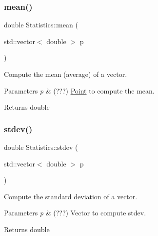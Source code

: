 \subsubsection{\texorpdfstring{mean()}{mean()}}
{\footnotesize\ttfamily double Statistics\+::mean (\begin{DoxyParamCaption}\item[{std\+::vector$<$ double $>$}]{p }\end{DoxyParamCaption})\hspace{0.3cm}{\ttfamily [static]}}



Compute the mean (average) of a vector. 


\begin{DoxyParams}{Parameters}
{\em p} & (???) \hyperlink{class_point}{Point} to compute the mean. \\
\hline
\end{DoxyParams}
\begin{DoxyReturn}{Returns}
double 
\end{DoxyReturn}
\mbox{\label{class_statistics_a75435245095cd0fd54b2d57a6ae592da}} 
\subsubsection{\texorpdfstring{stdev()}{stdev()}}
{\footnotesize\ttfamily double Statistics\+::stdev (\begin{DoxyParamCaption}\item[{std\+::vector$<$ double $>$}]{p }\end{DoxyParamCaption})\hspace{0.3cm}{\ttfamily [static]}}



Compute the standard deviation of a vector. 


\begin{DoxyParams}{Parameters}
{\em p} & (???) Vector to compute stdev. \\
\hline
\end{DoxyParams}
\begin{DoxyReturn}{Returns}
double 
\end{DoxyReturn}
\mbox{\label{class_statistics_af3a74e0ab944341356b8afeb9fc0ecbd}} 
